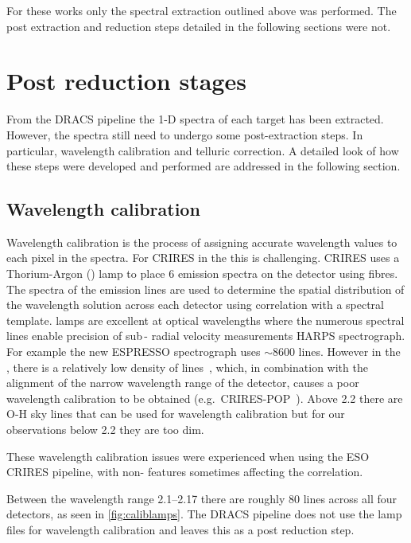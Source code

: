 For these works only the spectral extraction outlined above was performed.
The post extraction and reduction steps detailed in the following sections were not.


\section{Post reduction stages}
\label{sec:posreduction}
From the {DRACS} pipeline the 1-D spectra of each target has been extracted.
However, the spectra still need to undergo some post-extraction steps.
In particular, wavelength calibration and telluric correction.
A detailed look of how these steps were developed and performed are addressed in the following section.

\subsection{Wavelength calibration}
\label{subsec:wavecalib}

Wavelength calibration is the process of assigning accurate wavelength values to each pixel in the spectra.
For {CRIRES} in the \nir{} this is challenging.
{CRIRES} uses a Thorium-Argon (\thar) lamp to place 6 emission spectra on the detector using fibres.
The spectra of the \thar{} emission lines are used to determine the spatial distribution of the wavelength solution across each detector using correlation with a spectral template.
\thar{} lamps are excellent at optical wavelengths where the numerous spectral lines enable precision of sub\,-\mps{} radial velocity measurements {HARPS} spectrograph.
For example the new ESPRESSO spectrograph uses \(\sim8600\) \thar{} lines.
However in the \nir{}, there is a relatively low density of \thar{} lines~\citep{kerber_laboratory_2009}, which, in combination with the alignment of the narrow wavelength range of the detector, causes a poor wavelength calibration to be obtained (e.g.\ {CRIRES}-POP~\citep{nicholls_crirespop_2017}).
Above 2.2\um{} there are {O-H} sky lines that can be used for wavelength calibration but for our observations below 2.2\um{} they are too dim.

These wavelength calibration issues were experienced when using the {ESO} {CRIRES} pipeline, with non-\thar{} features sometimes affecting the correlation.

Between the wavelength range 2.1--2.17\um{} there are roughly 80 \thar{} lines across all four detectors, as seen in \cref{fig:caliblamps}.
The {DRACS} pipeline does not use the \thar{} lamp files for wavelength calibration and leaves this as a post reduction step.

